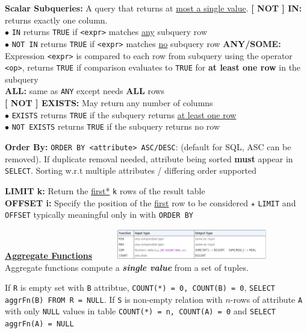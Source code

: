 \documentclass[10pt,landscape]{article}
\begin{document}
\begin{multicols*}{3}
\textbf{Scalar Subqueries:} A query that returns at \underline{most a single value}.
\textbf{[ NOT ] IN:} returns exactly one column. \\ 
    $\bullet$ \verb|IN| returns \verb|TRUE| if \verb|<expr>| matches \underline{any} subquery row \\ 
    $\bullet$ \verb|NOT IN| returns \verb|TRUE| if \verb|<expr>| matches \underline{no} subquery row
\textbf{ANY/SOME:} Expression \verb|<expr>| is compared
to each row from subquery using the operator \verb|<op>|, returns \verb|TRUE| if comparison evaluates to \verb|TRUE| for \textbf{at least one row} in the subquery \\ 
\textbf{ALL:} same as \verb|ANY| except needs \textbf{ALL} rows \\ 
\textbf{[ NOT ] EXISTS:} May return any number of columns \\ 
    $\bullet$ \verb|EXISTS| returns \verb|TRUE| if the subquery returns \underline{at least one row} \\ 
    $\bullet$ \verb|NOT EXISTS| returns \verb|TRUE| if the subquery returns no row

 \newline

\textbf{Order By:} \verb|ORDER BY <attribute> ASC/DESC|: (default for SQL, ASC can be removed).
If duplicate removal needed, attribute being sorted \textbf{must} appear in \verb|SELECT|. Sorting w.r.t multiple attributes /  differing order supported

\textbf{LIMIT k:} Return the \underline{first*} \verb|k| rows of the result table \\ 
\textbf{OFFSET i:} Specify the position of the \underline{first} row to be considered
$\star$ \verb|LIMIT| and \verb|OFFSET| typically meaningful only in with \verb|ORDER BY|

\textbf{\underline{Aggregate Functions}}
\includegraphics[height=1.3cm, width=8.5cm]{images/aggregatefunction.png}
Aggregate functions compute a \textbf{\textit{single value}} from a set of tuples.

If \verb|R| is empty set with \verb|B| attribtue, \verb|COUNT(*) = 0, COUNT(B) = 0|, \verb|SELECT aggrFn(B) FROM R = NULL|. 
If \verb|S| is non-empty relation with $n$-rows of attribute \verb|A| with only \verb|NULL| values in table
\verb|COUNT(*) = n, COUNT(A) = 0| and \verb|SELECT aggrFn(A) = NULL|


\end{multicols*}
\end{document}
